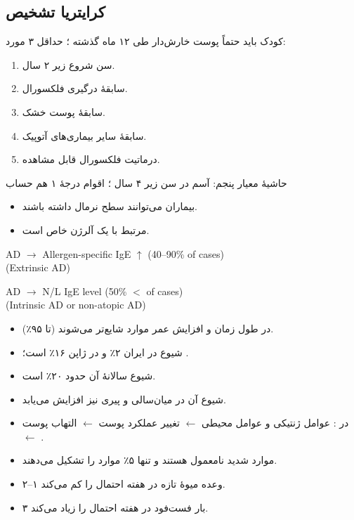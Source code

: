\documentclass[12pt,a4paper]{article}
\begin{document}
\subsection*{کرایتریا تشخیص}
کودک باید حتماً پوست خارش‌دار طی ۱۲ ماه گذشته \Atopiccut؛ حداقل ۳ مورد:
\begin{enumerate}
  \item سن شروع زیر ۲ سال.
  \item سابقهٔ درگیری فلکسورال.
  \item سابقهٔ پوست خشک.
  \item سابقهٔ سایر بیماری‌های آتوپیک.
  \item درماتیت فلکسورال قابل مشاهده.
\end{enumerate}
\noindent حاشیهٔ معیار پنجم: آسم در سن زیر ۴ سال \Atopiccut؛ اقوام درجهٔ ۱ هم حساب \Atopiccut

\begin{itemize}
  \item بیماران  می‌توانند سطح نرمال  داشته باشند.
  \item {}  مرتبط با یک آلرژن خاص است.
\end{itemize}

\begin{latin}
\noindent AD $\longrightarrow$ Allergen-specific IgE $\uparrow$ (40--90\% of cases)\\
\hspace*{2em}(Extrinsic AD)\par\medskip
\noindent AD $\longrightarrow$ N/L IgE level (50\% $<$ of cases)\\
\hspace*{2em}(Intrinsic AD or non-atopic AD)
\end{latin}

\begin{itemize}
  \item در طول زمان و افزایش عمر موارد  شایع‌تر می‌شوند (تا ۹۵٪).
  \item شیوع  در ایران ۲٪ و در ژاپن ۱۶٪ است؛ .
  \item شیوع سالانهٔ آن حدود ۲۰٪ است.
  \item شیوع آن در میان‌سالی و پیری نیز افزایش می‌یابد.
  \item در : عوامل ژنتیکی و عوامل محیطی $\leftarrow$ تغییر عملکرد پوست $\leftarrow$ التهاب پوست $\leftarrow$ .
  \item موارد شدید  نامعمول هستند و تنها ۵٪ موارد را تشکیل می‌دهند.
  \item ۲–۱ وعده میوهٔ تازه در هفته احتمال  را کم می‌کند.
  \item ۳ بار فست‌فود در هفته احتمال  را زیاد می‌کند.
\end{itemize}
\end{document}
